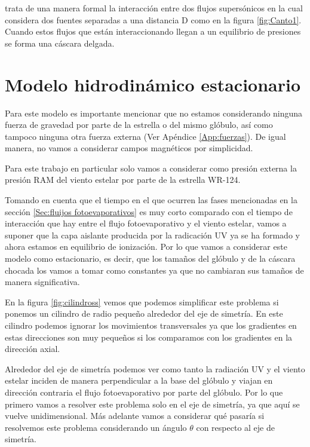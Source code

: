 \documentclass{book}
\begin{document}
\cite{Canto:1996} trata de una manera formal la interacción entre dos flujos supersónicos en la cual considera dos fuentes separadas a una distancia D como en la figura \ref{fig:Canto1}. Cuando estos flujos que están interaccionando llegan a un equilibrio de presiones se forma una cáscara delgada.


\section{Modelo hidrodinámico estacionario}

Para este modelo es importante mencionar que no estamos considerando ninguna fuerza de gravedad por parte de la estrella o del mismo glóbulo, así como tampoco ninguna otra fuerza externa (Ver Apéndice \ref{App:fuerzas}). De igual manera, no vamos a considerar campos magnéticos por simplicidad.

Para este trabajo en particular solo vamos a considerar como presión externa la presión RAM del viento estelar por parte de la estrella WR-124.

Tomando en cuenta que el tiempo en el que ocurren las fases mencionadas en la sección \ref{Sec:fluijos fotoevaporativos} es muy corto comparado con el tiempo de interacción que hay entre el flujo fotoevaporativo y el viento estelar, vamos a suponer que la capa aislante producida por la radicación UV ya se ha formado y ahora estamos en equilibrio de ionización. Por lo que vamos a considerar este modelo como estacionario, es decir, que los tamaños del glóbulo y de la cáscara chocada los vamos a tomar como constantes ya que no cambiaran sus tamaños de manera significativa.

En la figura \ref{fig:cilindross} vemos que podemos simplificar este problema si ponemos un cilindro de radio pequeño alrededor del eje de simetría.  En este cilindro podemos ignorar los movimientos transversales ya que los gradientes en estas direcciones son muy pequeños si los comparamos con los gradientes en la dirección axial. 

Alrededor del eje de simetría podemos ver como tanto la radiación UV y el viento estelar inciden de manera perpendicular a la base del glóbulo y viajan en dirección contraria el flujo fotoevaporativo por parte del glóbulo. Por lo que primero vamos a resolver este problema solo en el eje de simetría, ya que aquí se vuelve unidimensional. Más adelante vamos a considerar qué pasaría si resolvemos este problema considerando un ángulo $\theta$ con respecto al eje de simetría.
\end{document}
